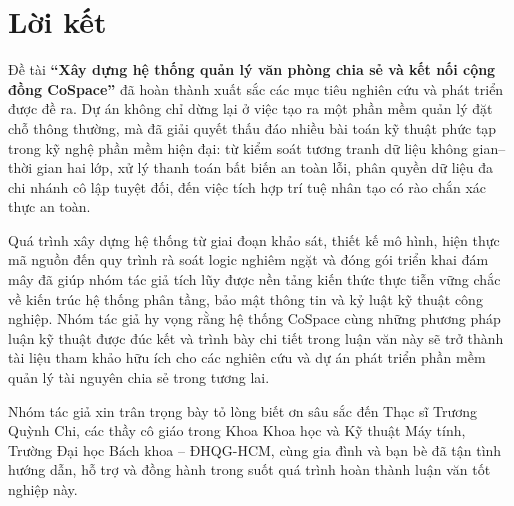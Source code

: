 \section{Lời kết}
\label{sec:kl_loiket}

Đề tài \textbf{``Xây dựng hệ thống quản lý văn phòng chia sẻ và kết nối cộng đồng CoSpace''} đã hoàn thành xuất sắc các mục tiêu nghiên cứu và phát triển được đề ra. Dự án không chỉ dừng lại ở việc tạo ra một phần mềm quản lý đặt chỗ thông thường, mà đã giải quyết thấu đáo nhiều bài toán kỹ thuật phức tạp trong kỹ nghệ phần mềm hiện đại: từ kiểm soát tương tranh dữ liệu không gian--thời gian hai lớp, xử lý thanh toán bất biến an toàn lỗi, phân quyền dữ liệu đa chi nhánh cô lập tuyệt đối, đến việc tích hợp trí tuệ nhân tạo có rào chắn xác thực an toàn.

Quá trình xây dựng hệ thống từ giai đoạn khảo sát, thiết kế mô hình, hiện thực mã nguồn đến quy trình rà soát logic nghiêm ngặt và đóng gói triển khai đám mây đã giúp nhóm tác giả tích lũy được nền tảng kiến thức thực tiễn vững chắc về kiến trúc hệ thống phân tầng, bảo mật thông tin và kỷ luật kỹ thuật công nghiệp. Nhóm tác giả hy vọng rằng hệ thống CoSpace cùng những phương pháp luận kỹ thuật được đúc kết và trình bày chi tiết trong luận văn này sẽ trở thành tài liệu tham khảo hữu ích cho các nghiên cứu và dự án phát triển phần mềm quản lý tài nguyên chia sẻ trong tương lai.

Nhóm tác giả xin trân trọng bày tỏ lòng biết ơn sâu sắc đến Thạc sĩ Trương Quỳnh Chi, các thầy cô giáo trong Khoa Khoa học và Kỹ thuật Máy tính, Trường Đại học Bách khoa -- ĐHQG-HCM, cùng gia đình và bạn bè đã tận tình hướng dẫn, hỗ trợ và đồng hành trong suốt quá trình hoàn thành luận văn tốt nghiệp này.
